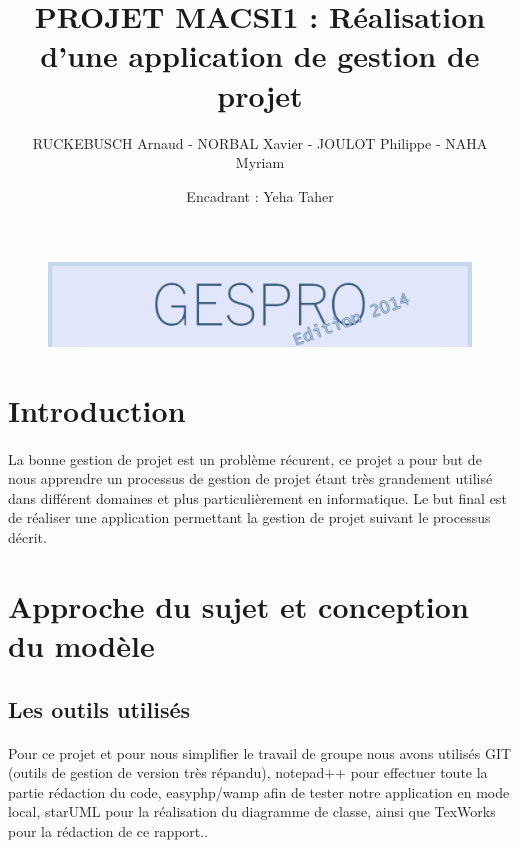 \documentclass[a4paper, 12pt]{article}
\title{PROJET MACSI1 : Réalisation d'une application de gestion de projet }
\author{RUCKEBUSCH Arnaud - NORBAL Xavier - JOULOT Philippe - NAHA Myriam}
\date{Encadrant : Yeha Taher}
\makeatletter
\def\maketitle{
  \null
  \thispagestyle{empty}
  \vfill
  \begin{center}\leavevmode
    \normalfont
    {\LARGE \@title\par}
    \vskip 1cm
    {\Large \@author\par}
    \vskip 1cm
    {\Large \@date\par}
  \end{center}
  \vfill
  \null
  \cleardoublepage
  }
\makeatother
\begin{document}
\begin{figure}[h!]
	\includegraphics[width=1\textwidth]{GESPRO2014.png}
\end{figure}
\maketitle

\setcounter{page}{1}
\tableofcontents
\newpage



\section{Introduction}
\paragraph{}La bonne gestion de projet est un problème récurent, ce projet a pour but de nous apprendre un processus de gestion de projet étant très grandement utilisé dans différent domaines et plus particulièrement en informatique. Le but final est de réaliser une application permettant la gestion de projet suivant le processus décrit.

\newpage

\section{Approche du sujet et conception du modèle}

\subsection{Les outils utilisés}
\paragraph{}Pour ce projet et pour nous simplifier le travail de groupe nous avons utilisés GIT (outils de gestion de version très répandu), notepad++ pour effectuer toute la partie rédaction du code, easyphp/wamp afin de tester notre application en mode local, starUML pour la réalisation du diagramme de classe, ainsi que TexWorks pour la rédaction de ce rapport..
\end{document}
